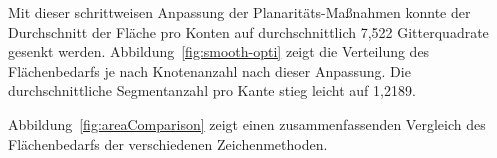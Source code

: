 \documentclass[a4paper]{scrreprt}
\theoremstyle{definition}
\begin{document}
Mit dieser schrittweisen Anpassung der Planaritäts-Maßnahmen konnte der Durchschnitt der Fläche pro Konten auf durchschnittlich 7,522 Gitterquadrate gesenkt werden. Abbildung~\ref{fig:smooth-opti} zeigt die Verteilung des Flächenbedarfs je nach Knotenanzahl nach dieser Anpassung. Die durchschnittliche Segmentanzahl pro Kante stieg leicht auf 1,2189.

Abbildung~\ref{fig:areaComparison} zeigt einen zusammenfassenden Vergleich des Flächenbedarfs der verschiedenen Zeichenmethoden.







\end{document}
